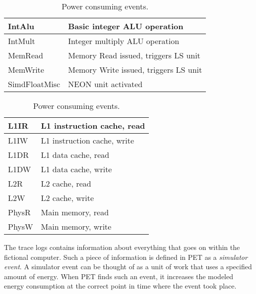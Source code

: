 \begin{table}[ht]
    \centering
    \begin{minipage}[b]{\linewidth}
        \centering
        \begin{tabular}{|l|l|}
            \hline
            IntAlu      & Basic integer ALU operation\\
            \hline
            IntMult     & Integer multiply ALU operation \\
            \hline
            MemRead     & Memory Read issued, triggers LS unit \\
            \hline
            MemWrite    & Memory Write issued, triggers LS unit \\
            \hline
            SimdFloatMisc     & NEON unit activated \\
            \hline
        \end{tabular}
    \end{minipage}

    \begin{minipage}[b]{\linewidth}
        \centering
        \begin{tabular}{|l|l|}
            \hline
            L1IR    & L1 instruction cache, read \\
            \hline
            L1IW    & L1 instruction cache, write \\
            \hline
            L1DR    & L1 data cache, read \\
            \hline
            L1DW    & L1 data cache, write \\
            \hline
            L2R     & L2 cache, read \\
            \hline
            L2W     & L2 cache, write \\
            \hline
            PhysR   & Main memory, read \\
            \hline
            PhysW   & Main memory, write \\
            \hline
        \end{tabular}
    \end{minipage}
    \caption{Power consuming events.}
    \label{tbl:events}
\end{table}

The trace logs contains information about everything that goes on within the
fictional computer. Such a piece of information is defined in PET as a
\emph{simulator event}. A simulator event can be thought of as a unit of work
that uses a specified amount of energy. When PET finds such an event, it
increases the modeled energy consumption at the correct point in time where the
event took place.

